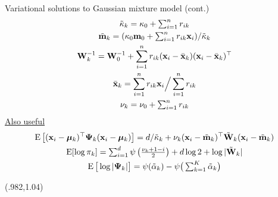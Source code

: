 \begin{frame}{Variational solutions to Gaussian mixture model (cont.)}
  \vspace{-20pt}
  \begin{align*}
  \begin{gathered}
    \tilde\kappa_k = \kappa_0 + \textstyle\sum_{i=1}^n r_{ik} \\
    \tilde{{\mathbf m}}_k = (\kappa_0{\mathbf m}_0 + \textstyle\sum_{i=1}^n r_{ik}{\mathbf x}_i) / \tilde\kappa_k \\
    {\mathbf W}_k^{-1} = {\mathbf W}_0^{-1} + \sum_{i=1}^n r_{ik}({\mathbf x}_i - \bar{{\mathbf x}}_k)({\mathbf x}_i - \bar{{\mathbf x}}_k)^\top \\
    \bar{{\mathbf x}}_k = \sum_{i=1}^n r_{ik}{\mathbf x}_i \Big/ \sum_{i=1}^n r_{ik} \\
    \nu_k = \nu_0 + \textstyle\sum_{i=1}^n r_{ik}
  \end{gathered} 
  \end{align*}
  \underline{Also useful}
  \begin{align*}
  \begin{gathered}
    \operatorname{E} \left[({\mathbf x}_i - {\bm\mu}_k)^\top {\bm\Psi}_k ({\mathbf x}_i - {\bm\mu}_k)  \right] = 
    d/\tilde\kappa_k + \nu_k({\mathbf x}_i - \tilde{{\mathbf m}}_k)^\top \tilde{{\mathbf W}}_k ({\mathbf x}_i - \tilde{{\mathbf m}}_k) \\
    \operatorname{E}[\log\pi_k] = \textstyle\sum_{i=1}^d \psi\left(\frac{\nu_k + 1 - i}{2} \right) + d \log 2 + \log |\tilde{{\mathbf W}}_k |  \\
    \operatorname{E}\big[\log|{\bm\Psi}_k|\big] = \psi(\tilde\alpha_k) - \psi\big(\textstyle\sum_{k=1}^K\tilde\alpha_k\big)
  \end{gathered} 
  \end{align*}  
  
  \begin{textblock*}{3cm}(.982\textwidth,1.04\textheight)%
    \hyperlink{vigmm}{}      
  \end{textblock*} 
\end{frame}
